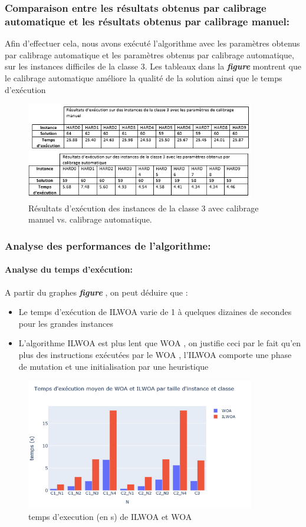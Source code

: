 \documentclass[12pt]{article}
\begin{document}
\subsubsection{Comparaison entre les résultats obtenus par calibrage automatique et les résultats obtenus par calibrage manuel:                }
Afin d’effectuer cela, nous avons exécuté l’algorithme avec les paramètres obtenus par calibrage automatique et les paramètres obtenus par calibrage automatique, sur les instances difficiles de la classe 3. Les tableaux dans la \textbf{\emph{figure }} montrent que le calibrage automatique améliore la qualité de la solution ainsi que le temps d’exécution
\begin{figure}[h!]
    \centering
     \includegraphics[width=10cm]{../figures/tabreslts.PNG}
     \caption[\small]{Résultats d'exécution des instances de la classe 3 avec calibrage manuel vs. calibrage automatique.}
     \label{tab:calib_c3}
 \end{figure}
\subsubsection{Analyse des performances de l'algorithme: }
\paragraph{Analyse du temps d'exécution:}
A partir du graphes \textbf{\emph{figure }} , on peut déduire que :
\begin{itemize}
    \item Le temps d'exécution de ILWOA varie de 1  à quelques dizaines de secondes pour les grandes instances 
    \item L’algorithme ILWOA est plus lent que WOA , on justifie ceci par le fait qu’en plus des instructions exécutées par le WOA , l’ILWOA comporte une phase de mutation et une initialisation par une heuristique  
\end{itemize}
\begin{figure}[h!]
    \centering
     \includegraphics[width=10cm]{../figures/woavsilwoatemps.PNG}
     \caption[\small]{temps d'execution (en s) de ILWOA et WOA}
    \label{fig:texec_comp}
    \end{figure}
\end{document}
